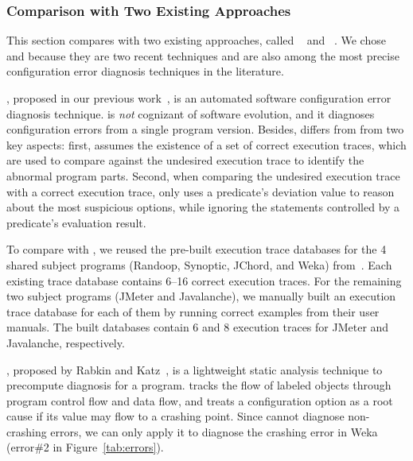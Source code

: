 \subsubsection{Comparison with Two Existing Approaches}
\label{sec:existing}

This section compares \ourtool with two existing approaches,
called \prevtool~\cite{Zhang:2013:ADS} and \conftool~\cite{Rabkin:2011:PPC}.
We chose \prevtool and \conftool because
they are two recent techniques and are also among the most
precise configuration error diagnosis techniques in the literature.


\noindent\textbf{\prevtoolnoxspace}, proposed in our previous work~\cite{Zhang:2013:ADS},
is an automated
software configuration error diagnosis technique. %
\prevtool is \textit{not} cognizant of
software evolution, and it diagnoses configuration errors from
a single program version.
Besides, \prevtool differs from \ourtool from two key aspects:
first, \prevtool assumes the existence of a set of correct execution
traces, which are used to compare against the undesired
execution trace to identify the abnormal program parts.
Second, when comparing the undesired execution trace with a
correct execution trace, \prevtool only uses a predicate's deviation
value to reason about the most suspicious options, while
ignoring the statements controlled by a predicate's evaluation result. 

To compare \ourtool with \prevtool, 
we reused the pre-built execution trace databases
for the 4 shared subject programs (Randoop, Synoptic, JChord, and Weka)
from~\cite{Zhang:2013:ADS}.
Each existing trace database contains 6--16 correct
execution traces.
For the remaining two subject programs (JMeter and
Javalanche), we manually built an execution trace database
for each of them by running correct examples from their user manuals.
The built databases contain 6 and 8
execution traces for JMeter and Javalanche, respectively.

\vspace{1mm}

\noindent \textbf{\conftoolnoxspace}, proposed by Rabkin and
Katz~\cite{Rabkin:2011:PPC}, is a lightweight
static analysis technique to precompute diagnosis for a program.
\conftool tracks the flow of labeled objects through 
program control flow and data flow, and treats a configuration option
as a root cause if its value may flow to a crashing point.
Since \conftool cannot diagnose non-crashing errors, we
can only apply it to diagnose the crashing error in
Weka (error\#2 in Figure~\ref{tab:errors}).


